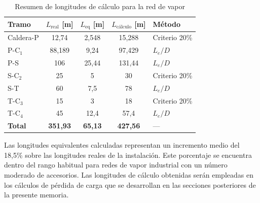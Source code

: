 \begin{table}[H]
	\centering
	\caption{Resumen de longitudes de cálculo para la red de vapor}
	\label{tab:resumen-longitudes-calculo}
	\begin{tabular}{lcccl}
		\toprule
		\textbf{Tramo} & \textbf{$L_{\text{real}}$ [m]} & \textbf{$L_{\text{eq}}$ [m]} & \textbf{$L_{\text{cálculo}}$ [m]} & \textbf{Método} \\
		\midrule
		Caldera-P      & 12,74                          & 2,548                        & 15,288                            & Criterio 20\%   \\
		P-C$_1$        & 88,189                         & 9,24                         & 97,429                            & $L_e/D$         \\
		P-S            & 106                            & 25,44                        & 131,44                            & $L_e/D$         \\
		S-C$_2$        & 25                             & 5                            & 30                                & Criterio 20\%   \\
		S-T            & 60                             & 7,5                          & 78                                & $L_e/D$         \\
		T-C$_3$        & 15                             & 3                            & 18                                & Criterio 20\%   \\
		T-C$_4$        & 45                             & 12,4                         & 57,4                              & $L_e/D$         \\
		\midrule
		\textbf{Total} & \textbf{351,93}                & \textbf{65,13}               & \textbf{427,56}                   & ---             \\
		\bottomrule
	\end{tabular}
\end{table}

Las longitudes equivalentes calculadas representan un incremento medio del 18,5\% sobre las longitudes reales de la instalación. Este porcentaje se encuentra dentro del rango habitual para redes de vapor industrial con un número moderado de accesorios. Las longitudes de cálculo obtenidas serán empleadas en los cálculos de pérdida de carga que se desarrollan en las secciones posteriores de la presente memoria.


